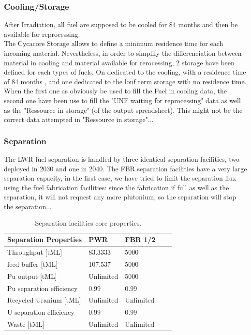 \documentclass[12pt]{article}
\begin{document}
\subsubsection{Cooling/Storage}
After Irradiation, all fuel are supposed to be
cooled for 84 months and then be available for
reprocessing.\\
The Cycacore Storage allows to define a minimum
residence time for each incoming material.
Nevertheless, in order to simplify the
differenciation between material in cooling and
material available for rerocessing, 2 storage have
been defined for each types of fuels. On dedicated
to the cooling, with a residence time of 84 months
, and one dedicated to the lonf term storage with
no residence time.
When the first one as obviously be used to fill
the Fuel in cooling data, the second one have been
use to fill the "UNF waiting for reprocessing"
data as well as the "Ressource in storage" (of the
output spreadsheet). This might not be the correct
 data attempted in "Ressource in storage"...

\subsubsection{Separation}

The LWR fuel separation is handled by three
identical separation facilities, two deployed in
2030 and one in 2040. The FBR separation
facilities have a very large separation capacity,
in the first case, we have tried to limit the
separation flux using the fuel fabrication
facilities: since the fabrication if full as well
as the separation, it will not request any more
plutonium, so the separation will stop the
separation...

\begin{table}[h!]
\centering
\begin{tabular}{lllll}
\hline
Separation Properties	&	PWR		&	FBR 1/2	\\
\hline
Throughput [tML]		&	83.3333	&	5000		\\
feed buffer [tML]		&	107.537	&	5000		\\
Pu output  [tML]		&	Unlimited	&	5000		\\
Pu separation efficiency	&	0.99		&	0.99		\\
Recycled Uranium [tML]	&	Unlimited	&	Unlimited	\\
U separation efficiency	&	0.99		&	0.99		\\
Waste [tML]			&	Unlimited	&	Unlimited	\\
\hline
\end{tabular}
\caption{Separation facilities core properties. }
\label{tab:separation_1}
\end{table}
\end{document}
